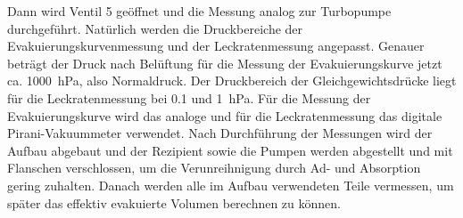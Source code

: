 Dann wird Ventil 5 geöffnet und die Messung analog 
zur Turbopumpe durchgeführt. Natürlich werden die Druckbereiche der Evakuierungskurvenmessung 
und der Leckratenmessung angepasst. Genauer beträgt der Druck nach Belüftung für die 
Messung der Evakuierungskurve jetzt ca. \SI{1000}{\hecto\pascal}, also Normaldruck. Der 
Druckbereich der Gleichgewichtsdrücke liegt für die Leckratenmessung bei \SI{0.1}{} und 
\SI{1}{\hecto\pascal}. Für die Messung der Evakuierungskurve wird das analoge und für 
die Leckratenmessung das digitale Pirani-Vakuummeter verwendet. 
\newline
\newline
Nach Durchführung der Messungen wird der Aufbau abgebaut und der Rezipient sowie die Pumpen 
werden abgestellt und mit Flanschen verschlossen, um die Verunreihnigung durch Ad- und Absorption 
gering zuhalten. Danach werden alle im Aufbau verwendeten Teile vermessen, um später das effektiv 
evakuierte Volumen berechnen zu können.
